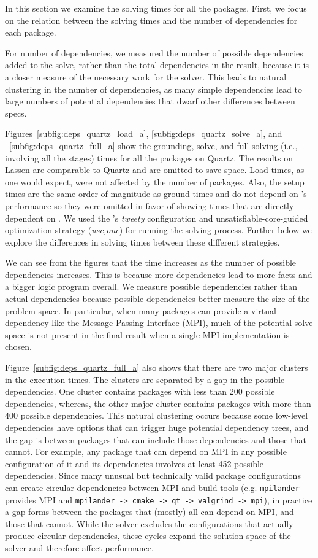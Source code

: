 In this section we examine the solving times for all the packages. First, we focus on
the relation between the solving times and the number of dependencies for each package.

For number of dependencies, we measured the number of possible
dependencies added to the solve, rather than the total dependencies in
the result, because it is a closer measure of the necessary work for
the solver. This leads to natural clustering in the number of
dependencies, as many simple dependencies lead to large numbers of
potential dependencies that dwarf other differences between specs.

Figures~\ref{subfig:deps_quartz_load_a}, \ref{subfig:deps_quartz_solve_a}, and
~\ref{subfig:deps_quartz_full_a} show the grounding, solve, and full solving (i.e.,
involving all the stages) times for all the packages on Quartz. The results on Lassen
are comparable to Quartz and are omitted to save space. Load times, as one would expect,
were not affected by the number of packages. Also, the setup times are the same order of
magnitude as ground times and do not depend on \clingo{}'s performance so they were
omitted in favor of showing times that are directly dependent on \clingo{}. We used the
\clingo{}'s {\it tweety} configuration and unsatisfiable-core-guided optimization strategy
({\it usc,one}) for running the solving process. Further below we explore the differences
in solving times between these different strategies.

We can see from the figures that the time increases as the number of possible
dependencies increases. This is because more dependencies lead
to more facts and a bigger logic program overall. We measure possible
dependencies rather than actual dependencies because possible dependencies
better measure the size of the problem space. In particular, when many packages can
provide a virtual dependency like the Message Passing Interface (MPI), much of the
potential solve space is not present in the final result when a single MPI
implementation is chosen.

Figure~\ref{subfig:deps_quartz_full_a} also shows that there are two major clusters in
the execution times. The clusters are separated by a gap in the possible dependencies.
One cluster contains packages with less than 200 possible dependencies, whereas, the
other major cluster contains packages with more than 400 possible dependencies. This
natural clustering occurs because some low-level dependencies have options that can
trigger huge potential dependency trees, and the gap is between packages that can
include those dependencies and those that cannot. For example, any package that can
depend on MPI in any possible configuration of it and its dependencies involves at least
452 possible dependencies. Since many unusual but technically valid package
configurations can create circular dependencies between MPI and build tools (e.g.
\texttt{mpilander} provides MPI and \texttt{mpilander -> cmake -> qt -> valgrind ->
  mpi}), in practice a gap forms between the packages that (mostly) all can depend on
MPI, and those that cannot. While the solver excludes the configurations that actually
produce circular dependencies, these cycles expand the solution space of the solver and
therefore affect performance.

